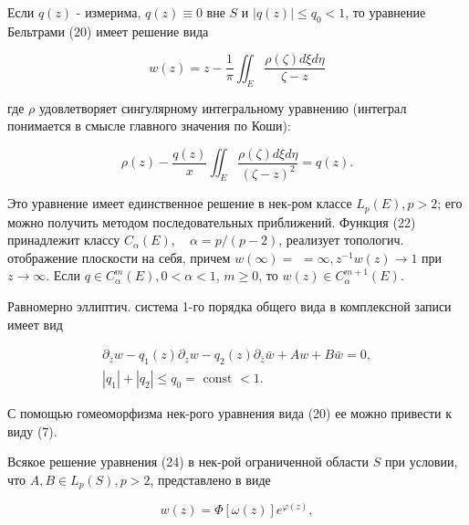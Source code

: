 \documentclass[10pt]{article}
\begin{document}
Если $q(z)$ - измерима, $q(z) \equiv 0$ вне $S$ и $|q(z)| \leqslant q_{0}<1$, то уравнение Бельтрами (20) имеет решение вида



\[

w(z)=z-\frac{1}{\pi} \iint_{E} \frac{\rho(\zeta) d \xi d \eta}{\zeta-z}

\]



где $\rho$ удовлетворяет сингулярному интегральному уравнению (интеграл понимается в смысле главного значения по Коши):



\[

\rho(z)-\frac{q(z)}{x} \iint_{E} \frac{\rho(\zeta) d \xi d \eta}{(\zeta-z)^{2}}=q(z) .

\]



Это уравнение имеет единственное решение в нек-ром классе $L_{p}(E), p>2$; его можно получить методом последовательных приближений. Функция (22) принадлежит классу $C_{\alpha}(E), \quad \alpha=p /(p-2)$, реализует топологич. отображение плоскости на себя, причем $w(\infty)=$ $=\infty, z^{-1} w(z) \rightarrow 1$ при $z \rightarrow \infty$. Если $q \in C_{\alpha}^{m}(E), 0<\alpha<1$, $m \geqslant 0$, то $w(z) \in C_{\alpha}^{m+1}(E)$.



Равномерно эллиптич. система 1-го порядка общего вида в комплексной записи имеет вид



\[

\begin{gathered}

\partial_{\bar{z}} w-q_{1}(z) \partial_{z} w-q_{2}(z) \partial_{\bar{z}} \bar{w}+A w+B \bar{w}=0, \\

\left|q_{1}\right|+\left|q_{2}\right| \leqslant q_{0}=\text { const }<1 .

\end{gathered}

\]



С помощью гомеоморфизма нек-рого уравнения вида (20) ее можно привести к виду (7).



Всякое решение уравнения (24) в нек-рой ограниченной области $S$ при условии, что $A, B \in L_{p}(S), p>2$, представлено в виде



\[

w(z)=\Phi[\omega(z)] e^{\varphi(z)},

\]
\end{document}
